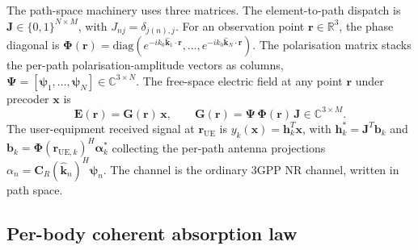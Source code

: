 \documentclass[journal,twocolumn,10pt]{IEEEtran}
\theoremstyle{plain}
\theoremstyle{remark}
\newcommand{\khat}{\hat{\bm{k}}}
\newcommand{\rr}{\mathbf{r}}
\newcommand{\xx}{\mathbf{x}}
\newcommand{\hh}{\mathbf{h}}
\newcommand{\bvec}{\mathbf{b}}
\newcommand{\GG}{\mathbf{G}}
\newcommand{\Jmat}{\mathbf{J}}
\newcommand{\Phimat}{\mathbf{\Phi}}
\newcommand{\Psimat}{\bm{\Psi}}
\newcommand{\psin}{\bm{\psi}_n}
\newcommand{\Complex}{\mathbb{C}}
\begin{document}
The path-space machinery uses three matrices. The element-to-path
dispatch is $\Jmat \in \{0, 1\}^{N \times M}$, with
$J_{nj} = \delta_{j(n), j}$. For an observation point
$\rr \in \mathbb{R}^3$, the phase diagonal is
$\Phimat(\rr) = \mathrm{diag}(e^{-i k_0 \khat_1 \cdot \rr}, \ldots,
e^{-i k_0 \khat_N \cdot \rr})$. The polarisation matrix stacks the
per-path polarisation-amplitude vectors as columns,
$\Psimat = [\bm\psi_1, \ldots, \bm\psi_N] \in \Complex^{3 \times N}$.
The free-space electric field at any point $\rr$ under precoder $\xx$
is
\begin{equation}\label{eq:E-decomp}
  \mathbf{E}(\rr) = \GG(\rr)\,\xx,
  \qquad
  \GG(\rr) = \Psimat\,\Phimat(\rr)\,\Jmat \in \Complex^{3 \times M}.
\end{equation}
The user-equipment received signal at $\rr_{\mathrm{UE}}$ is
$y_k(\xx) = \hh_k^T \xx$, with $\hh_k^* = \Jmat^T \bvec_k$ and
$\bvec_k = \Phimat(\rr_{\mathrm{UE},k})^H \bm\alpha_k^*$ collecting
the per-path antenna projections
$\alpha_n = \mathbf{C}_R(\khat_n)^H \psin$. The channel is the
ordinary 3GPP NR channel, written in path space.

\subsection{Per-body coherent absorption law}\label{sec:cohlaw}
\end{document}
